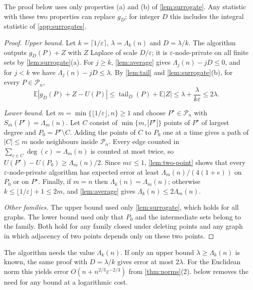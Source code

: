 \documentclass[anonymous,a4paper,USenglish,cleveref,autoref,thm-restate]{socg-lipics-v2021}
\newcommand{\eps}{\varepsilon}
\newcommand{\cP}{\mathcal{P}}
\newcommand{\Lam}{\Lambda}
\newcommand{\tail}{\operatorname{tail}}
\newcommand{\Ex}{\mathbb{E}}
\begin{document}
The proof below uses only properties (a) and (b) of \cref{lem:surrogate}. Any statistic with these two properties can replace $g_D$; for integer $D$ this includes the integral statistic of \cref{app:surrogates}.

\reduction*

\begin{proof}
\emph{Upper bound.} Let $k=\lceil1/\eps\rceil$, $\lambda=\Lam_k(n)$ and $D=\lambda/k$. The algorithm outputs $g_D(P)+Z$ with $Z$ Laplace of scale $D/\eps$; it is $\eps$-node-private on all finite sets by \cref{lem:surrogate}(a). For $j\ge k$, \cref{lem:average} gives $\Lam_j(n)-jD\le0$, and for $j<k$ we have $\Lam_j(n)-jD\le\lambda$. By \cref{lem:tail} and \cref{lem:surrogate}(b), for every $P\in\cP_n$,
\[
  \Ex|g_D(P)+Z-U(P)|\le\tail_D(P)+\Ex|Z|\le\lambda+\frac{\lambda}{k\eps}\le2\lambda .
\]

\emph{Lower bound.} Let $m=\min\{\lfloor1/\eps\rfloor,n\}\ge1$ and choose $P^\star\in\cP_n$ with $S_m(P^\star)=\Lam_m(n)$. Let $C$ consist of $\min\{m,|P^\star|\}$ points of $P^\star$ of largest degree and $P_0=P^\star\setminus C$. Adding the points of $C$ to $P_0$ one at a time gives a path of $|C|\le m$ node neighbours inside $\cP_n$. Every edge counted in $\sum_{c\in C}\deg(c)=\Lam_m(n)$ is counted at most twice, so $U(P^\star)-U(P_0)\ge\Lam_m(n)/2$. Since $m\eps\le1$, \cref{lem:two-point} shows that every $\eps$-node-private algorithm has expected error at least $\Lam_m(n)/(4(1+e))$ on $P_0$ or on $P^\star$. Finally, if $m=n$ then $\Lam_k(n)=\Lam_m(n)$; otherwise $k\le\lfloor1/\eps\rfloor+1\le2m$, and \cref{lem:average} gives $\Lam_k(n)\le2\Lam_m(n)$.

\emph{Other families.} The upper bound used only \cref{lem:surrogate}, which holds for all graphs. The lower bound used only that $P_0$ and the intermediate sets belong to the family. Both hold for any family closed under deleting points and any graph in which adjacency of two points depends only on these two points.
\end{proof}

\begin{remark}
\label{rem:unknown}
The algorithm needs the value $\Lam_k(n)$. If only an upper bound $\lambda\ge\Lam_k(n)$ is known, the same proof with $D=\lambda/k$ gives error at most $2\lambda$. For the Euclidean norm this yields error $O(n+n^{2/3}\eps^{-2/3})$ from \cref{thm:norms}(2).  below removes the need for any bound at a logarithmic cost.
\end{remark}
\end{document}
